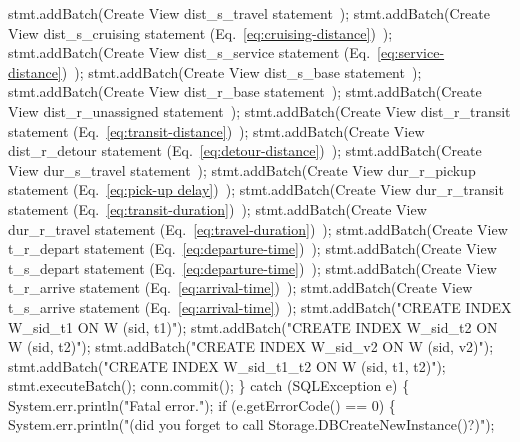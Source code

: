     stmt.addBatch(\LA{}Create View dist\_s\_travel statement~{\nwtagstyle{}}\RA{});
    stmt.addBatch(\LA{}Create View dist\_s\_cruising statement (Eq.~\ref{eq:cruising-distance})~{\nwtagstyle{}}\RA{});
    stmt.addBatch(\LA{}Create View dist\_s\_service statement (Eq.~\ref{eq:service-distance})~{\nwtagstyle{}}\RA{});
    stmt.addBatch(\LA{}Create View dist\_s\_base statement~{\nwtagstyle{}}\RA{});
    stmt.addBatch(\LA{}Create View dist\_r\_base statement~{\nwtagstyle{}}\RA{});
    stmt.addBatch(\LA{}Create View dist\_r\_unassigned statement~{\nwtagstyle{}}\RA{});
    stmt.addBatch(\LA{}Create View dist\_r\_transit statement (Eq.~\ref{eq:transit-distance})~{\nwtagstyle{}}\RA{});
    stmt.addBatch(\LA{}Create View dist\_r\_detour statement (Eq.~\ref{eq:detour-distance})~{\nwtagstyle{}}\RA{});
    stmt.addBatch(\LA{}Create View dur\_s\_travel statement~{\nwtagstyle{}}\RA{});
    stmt.addBatch(\LA{}Create View dur\_r\_pickup statement (Eq.~\ref{eq:pick-up delay})~{\nwtagstyle{}}\RA{});
    stmt.addBatch(\LA{}Create View dur\_r\_transit statement (Eq.~\ref{eq:transit-duration})~{\nwtagstyle{}}\RA{});
    stmt.addBatch(\LA{}Create View dur\_r\_travel statement (Eq.~\ref{eq:travel-duration})~{\nwtagstyle{}}\RA{});
    stmt.addBatch(\LA{}Create View t\_r\_depart statement (Eq.~\ref{eq:departure-time})~{\nwtagstyle{}}\RA{});
    stmt.addBatch(\LA{}Create View t\_s\_depart statement (Eq.~\ref{eq:departure-time})~{\nwtagstyle{}}\RA{});
    stmt.addBatch(\LA{}Create View t\_r\_arrive statement (Eq.~\ref{eq:arrival-time})~{\nwtagstyle{}}\RA{});
    stmt.addBatch(\LA{}Create View t\_s\_arrive statement (Eq.~\ref{eq:arrival-time})~{\nwtagstyle{}}\RA{});
    stmt.addBatch("CREATE INDEX W_sid_t1 ON W (sid, t1)");
    stmt.addBatch("CREATE INDEX W_sid_t2 ON W (sid, t2)");
    stmt.addBatch("CREATE INDEX W_sid_v2 ON W (sid, v2)");
    stmt.addBatch("CREATE INDEX W_sid_t1_t2 ON W (sid, t1, t2)");
    stmt.executeBatch();
    conn.commit();
  \} catch (SQLException e) \{
    System.err.println("Fatal error.");
    if (e.getErrorCode() == 0) \{
      System.err.println("(did you forget to call Storage.DBCreateNewInstance()?)");
